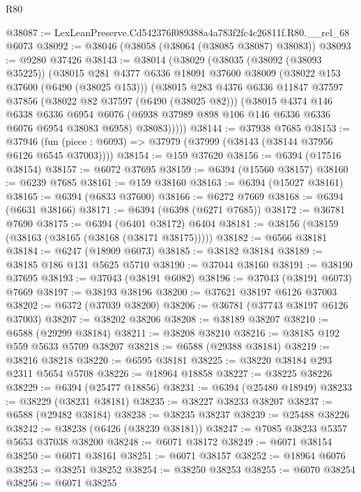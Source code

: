 \begin{lexlean}{R80}
\begin{coremodule}
@38087 := LexLeanPreserve.Cd542376f089388a4a783f2fc4c26811f.R80.__rel_68 @6073
@38092 := @38046 (@38058 (@38064 (@38085 @38087) @38083))
@38093 := @9280 @37426
@38143 := @38014
    (@38029
      (@38035
        (@38092 (@38093 @35225))
        (@38015
          @281
          @4377
          @6336
          @18091
          @37600
          @38009
          (@38022 @153 @37600 (@6490 (@38025 @153)))
          (@38015
            @283
            @4376
            @6336
            @11847
            @37597
            @37856
            (@38022 @82 @37597 (@6490 (@38025 @82)))
            (@38015
              @4374
              @146
              @6338
              @6336
              @6954
              @6076
              (@6938 @37989 @898 @106 @146 @6336 @6336 @6076 @6954 @38083 @6958)
              @38083)))))
@38144 := @37938 @7685
@38153 := @37946
    (fun (piece : @6093) => @37979 (@37999 (@38143 (@38144 @37956 @6126 @6545 @37003))))
@38154 := @159 @37620
@38156 := @6394 (@17516 @38154)
@38157 := @6072 @37695
@38159 := @6394 (@15560 @38157)
@38160 := @6239 @7685
@38161 := @159 @38160
@38163 := @6394 (@15027 @38161)
@38165 := @6394 (@6833 @37600)
@38166 := @6272 @7669
@38168 := @6394 (@6631 @38166)
@38171 := @6394 (@6398 (@6271 @7685))
@38172 := @36781 @7690
@38175 := @6394 (@6401 @38172) @6404
@38181 := @38156 (@38159 (@38163 (@38165 (@38168 (@38171 @38175)))))
@38182 := @6566 @38181
@38184 := @6247 (@18909 @6073)
@38185 := @38182 @38184
@38189 := @38185 @186 @131 @5625 @5710
@38190 := @37044 @38160
@38191 := @38190 @37695
@38193 := @37043 (@38191 @6082)
@38196 := @37043 (@38191 @6073) @7669
@38197 := @38193 @38196
@38200 := @37621 @38197 @6126 @37003
@38202 := @6372 (@37039 @38200)
@38206 := @36781 (@37743 @38197 @6126 @37003)
@38207 := @38202 @38206
@38208 := @38189 @38207
@38210 := @6588 (@29299 @38184)
@38211 := @38208 @38210
@38216 := @38185 @192 @559 @5633 @5709 @38207
@38218 := @6588 (@29388 @38184)
@38219 := @38216 @38218
@38220 := @6595 @38181
@38225 := @38220 @38184 @293 @2311 @5654 @5708
@38226 := @18964 @18858
@38227 := @38225 @38226
@38229 := @6394 (@25477 @18856)
@38231 := @6394 (@25480 @18949)
@38233 := @38229 (@38231 @38181)
@38235 := @38227 @38233 @38207
@38237 := @6588 (@29482 @38184)
@38238 := @38235 @38237
@38239 := @25488 @38226
@38242 := @38238 (@6426 (@38239 @38181))
@38247 := @7085 @38233 @5357 @5653 @37038 @38200
@38248 := @6071 @38172
@38249 := @6071 @38154
@38250 := @6071 @38161
@38251 := @6071 @38157
@38252 := @18964 @6076
@38253 := @38251 @38252
@38254 := @38250 @38253
@38255 := @6070 @38254
@38256 := @6071 @38255

\end{coremodule}
\end{lexlean}
